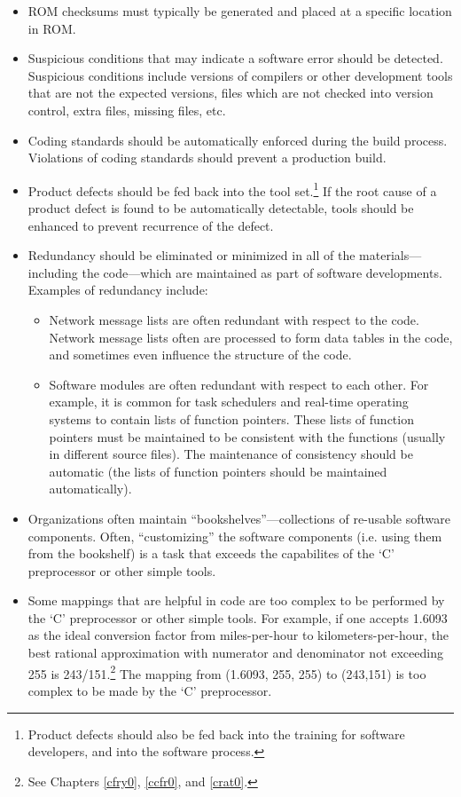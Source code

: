 \begin{itemize}
\item ROM checksums must typically be generated and placed at a specific
      location in ROM.
\item Suspicious conditions that may indicate a software error 
      should be detected.  Suspicious conditions include
	  versions of compilers or other development tools that are
	  not the expected versions, files which are not checked into
	  version control, extra files, missing files, etc.
\item Coding standards should be automatically enforced during the
      build process.  Violations of coding standards should prevent
	  a production build.
\item Product defects should be fed back into the tool set.\footnote{Product
      defects should also be fed back into the training for software
	  developers, and into the software process.}  If the root cause
	  of a product defect is found to be automatically detectable,
	  tools should be enhanced to prevent recurrence of the defect.
\item Redundancy should be eliminated or minimized in all of the
      materials---including the code---which are maintained as
	  part of software developments.  Examples of redundancy include:
	  \begin{itemize}
	  \item Network message lists are often redundant with respect to
	        the code.  Network message lists often are processed to
			form data tables in the code, and sometimes even influence
			the structure of the code.
      \item Software modules are often redundant with respect to
	        each other.  For example, it is common for task schedulers
			and real-time operating systems to contain lists of 
			function pointers.  These lists of function pointers
            must be maintained to be consistent with the functions
			(usually in different source files).  The maintenance
			of consistency should be automatic (the lists of function
			pointers should be maintained automatically).
	  \end{itemize}
\item Organizations often maintain ``bookshelves''---collections of
      re-usable software components.  Often, ``customizing'' the
	  software components (i.e. using them from the bookshelf)
	  is a task that exceeds the capabilites of the `C' preprocessor
	  or other simple tools.
\item Some mappings that are helpful in code are too complex to
      be performed by the `C' preprocessor or other simple
	  tools.  For example, if one accepts 1.6093 as the 
	  ideal conversion factor from miles-per-hour to 
	  kilometers-per-hour, the best rational approximation with
	  numerator and denominator not exceeding 255 is 243/151.\footnote{See
	  Chapters \cfryzeroxrefhyphen{}\ref{cfry0}, 
	  \ccfrzeroxrefhyphen{}\ref{ccfr0}, 
	  and \cratzeroxrefhyphen{}\ref{crat0}.}  The mapping from 
	  (1.6093, 255, 255) to (243,151) is too complex to be made
	  by the `C' preprocessor.
\end{itemize}

